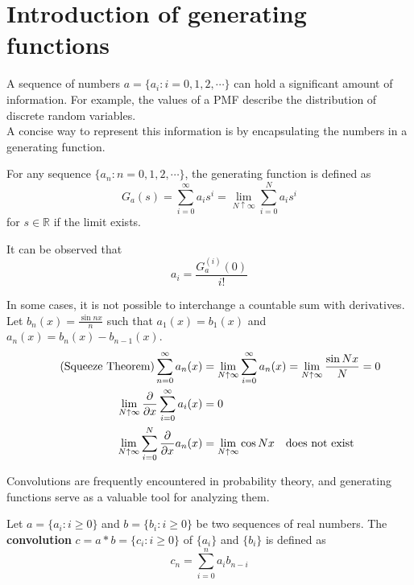 \documentclass{huhtakm-template-book}
\begin{document}
\section{Introduction of generating functions}
    A sequence of numbers $a=\{a_{i}:i=0,1,2,\cdots\}$ can hold a significant amount of information. For example, the values of a PMF describe the distribution of discrete random variables.\\
    A concise way to represent this information is by encapsulating the numbers in a generating function. 
    \begin{defn}
        For any sequence $\{a_{n}:n=0,1,2,\cdots\}$, the generating function is defined as
        \begin{equation*}
            G_{a}(s)=\sum_{i=0}^{\infty}a_{i}s^{i}=\lim_{N\uparrow\infty}\sum_{i=0}^{N}a_{i}s^{i}
        \end{equation*}
        for $s\in\mathbb{R}$ if the limit exists. 
    \end{defn}
    \begin{rem}
        It can be observed that
    \begin{equation*}
        a_{i}=\frac{G_{a}^{(i)}(0)}{i!}
    \end{equation*}
    \end{rem}
    \begin{eg}
        In some cases, it is not possible to interchange a countable sum with derivatives.\\
        Let $b_{n}(x)=\frac{\sin{nx}}{n}$ such that $a_{1}(x)=b_{1}(x)$ and $a_{n}(x)=b_{n}(x)-b_{n-1}(x)$.
        \begin{align*}
            \tag{Squeeze Theorem}
            \sum_{n=0}^{\infty}a_{n}(x)&=\lim_{N\uparrow\infty}\sum_{i=0}^{\infty}a_{n}(x)=\lim_{N\uparrow\infty}\frac{\sin{Nx}}{N}=0\\
            \lim_{N\uparrow\infty}\pdv*{\sum_{i=0}^{\infty}a_{i}(x)}{x}&=0\\
            \lim_{N\uparrow\infty}\sum_{i=0}^{N}\pdv*{a_{n}(x)}{x}&=\lim_{N\uparrow\infty}\cos{Nx}\quad \text{does not exist}
        \end{align*}
    \end{eg}
    Convolutions are frequently encountered in probability theory, and generating functions serve as a valuable tool for analyzing them.
    \begin{defn}
        Let $a=\{a_{i}:i\geq 0\}$ and $b=\{b_{i}:i\geq 0\}$ be two sequences of real numbers. The \textbf{convolution} $c=a*b=\{c_{i}:i\geq 0\}$ of $\{a_{i}\}$ and $\{b_{i}\}$ is defined as
        \begin{equation*}
            c_{n}=\sum_{i=0}^{n}a_{i}b_{n-i}
        \end{equation*}
    \end{defn}
\end{document}
